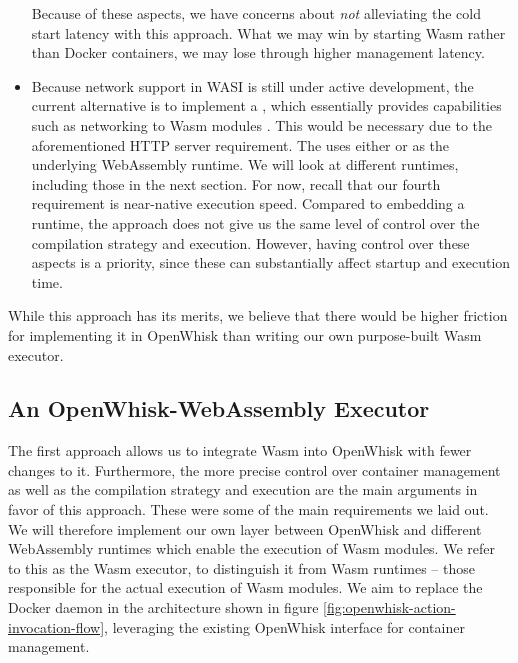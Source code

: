 \begin{itemize}
    Because of these aspects, we have concerns about \emph{not} alleviating the cold start latency with this approach. What we may win by starting Wasm rather than Docker containers, we may lose through higher management latency.
    \item Because network support in WASI is still under active development, the current alternative is to implement a , which essentially provides capabilities such as networking to Wasm modules \cite{WC2021}. This would be necessary due to the aforementioned HTTP server requirement. The  uses either  or  as the underlying WebAssembly runtime. We will look at different runtimes, including those in the next section. For now, recall that our fourth requirement is near-native execution speed. Compared to embedding a runtime, the  approach does not give us the same level of control over the compilation strategy and execution. However, having control over these aspects is a priority, since these can substantially affect startup and execution time.
\end{itemize}

While this approach has its merits, we believe that there would be higher friction for implementing it in OpenWhisk than writing our own purpose-built Wasm executor.

\subsection{An OpenWhisk-WebAssembly Executor}


The first approach allows us to integrate Wasm into OpenWhisk with fewer changes to it. Furthermore, the more precise control over container management as well as the compilation strategy and execution are the main arguments in favor of this approach. These were some of the main requirements we laid out. We will therefore implement our own layer between OpenWhisk and different WebAssembly runtimes which enable the execution of Wasm modules. We refer to this as the Wasm executor, to distinguish it from Wasm runtimes -- those responsible for the actual execution of Wasm modules. We aim to replace the Docker daemon in the architecture shown in figure \ref{fig:openwhisk-action-invocation-flow}, leveraging the existing OpenWhisk interface for container management.

